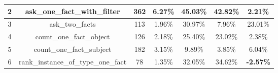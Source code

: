 \begin{table}[h!]
{\begin{tabular}{|c|c|cc|cc|c|}
    2                            & ask\_one\_fact\_with\_filter                                                                                           & 362                                                 & 6.27\%                                                                          & 45.03\%                                                                                                & 42.82\%                                                                                & 2.21\%                                  \\ \hline
    3                            & ask\_two\_facts                                                                                                        & 113                                                 & 1.96\%                                                                          & 30.97\%                                                                                                & 7.96\%                                                                                 & 23.01\%                                 \\ \hline
    4                            & count\_one\_fact\_object                                                                                               & 126                                                 & 2.18\%                                                                          & 25.40\%                                                                                                & 23.02\%                                                                                & 2.38\%                                  \\ \hline
    5                            & count\_one\_fact\_subject                                                                                              & 182                                                 & 3.15\%                                                                          & 9.89\%                                                                                                 & 3.85\%                                                                                 & 6.04\%                                  \\ \hline
    6                            & rank\_instance\_of\_type\_one\_fact                                                                                    & 78                                                  & 1.35\%                                                                          & 32.05\%                                                                                                & 34.62\%                                                                                & \textbf{-2.57\%}                        \\ \hline

\end{tabular}}
\end{table}
